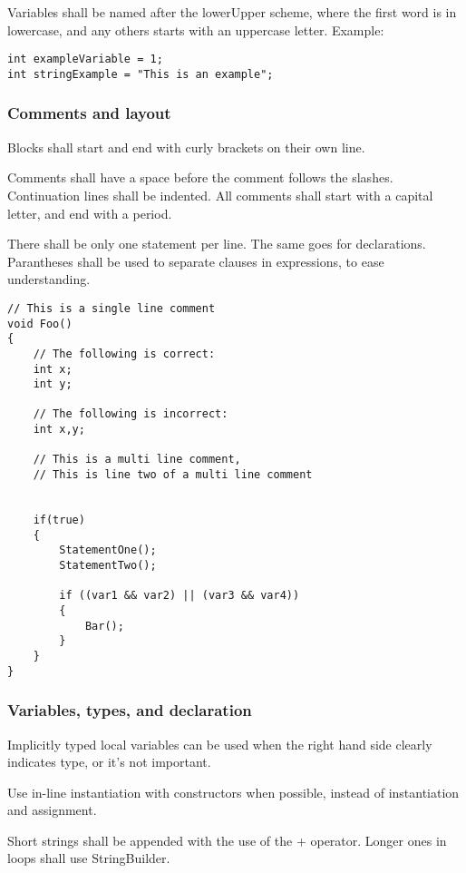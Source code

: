 \documentclass[12pt, a4paper]{article}
\begin{document}
Variables shall be named after the lowerUpper scheme, where the first word is in lowercase, and any others starts with an uppercase letter.
Example:\\
\begin{lstlisting}
int exampleVariable = 1;
int stringExample = "This is an example";
\end{lstlisting}

\subsubsection{Comments and layout}
Blocks shall start and end with curly brackets on their own line.

Comments shall have a space before the comment follows the slashes. Continuation lines shall be indented. All comments shall start with a capital letter, and end with a period.

There shall be only one statement per line. The same goes for declarations. Parantheses shall be used to separate clauses in expressions, to ease understanding.

\begin{lstlisting}
// This is a single line comment
void Foo()
{
	// The following is correct:
	int x;
	int y;
	
	// The following is incorrect:
	int x,y;
	
	// This is a multi line comment, 
	// This is line two of a multi line comment

	
	if(true)
	{
		StatementOne();
		StatementTwo();
		
		if ((var1 && var2) || (var3 && var4))
		{
			Bar();
		}
	}
}
\end{lstlisting}

\subsubsection{Variables, types, and declaration}
Implicitly typed local variables can be used when the right hand side clearly indicates type, or it's not important.

Use in-line instantiation with constructors when possible, instead of instantiation and assignment.

Short strings shall be appended with the use of the + operator. Longer ones in loops shall use StringBuilder.\\
\end{document}
